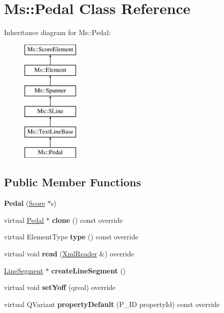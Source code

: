 \hypertarget{class_ms_1_1_pedal}{}\section{Ms\+:\+:Pedal Class Reference}
\label{class_ms_1_1_pedal}
Inheritance diagram for Ms\+:\+:Pedal\+:\begin{figure}[H]
\begin{center}
\leavevmode
\includegraphics[height=6.000000cm]{class_ms_1_1_pedal}
\end{center}
\end{figure}
\subsection*{Public Member Functions}
\begin{DoxyCompactItemize}
\item 
\mbox{\label{class_ms_1_1_pedal_a5778ce0dd5f31c2d91db97d389171541}} 
{\bfseries Pedal} (\hyperlink{class_ms_1_1_score}{Score} $\ast$s)
\item 
\mbox{\label{class_ms_1_1_pedal_a3888a6b2bb065247da7d2653dc054ebb}} 
virtual \hyperlink{class_ms_1_1_pedal}{Pedal} $\ast$ {\bfseries clone} () const override
\item 
\mbox{\label{class_ms_1_1_pedal_a3e37b6fb17d73077301087aed26f6cdc}} 
virtual Element\+Type {\bfseries type} () const override
\item 
\mbox{\label{class_ms_1_1_pedal_ab6a2aa95a32933995a1d143ed1a816d1}} 
virtual void {\bfseries read} (\hyperlink{class_ms_1_1_xml_reader}{Xml\+Reader} \&) override
\item 
\mbox{\label{class_ms_1_1_pedal_a8292749356ebaf816c7ecc975f12fc32}} 
\hyperlink{class_ms_1_1_line_segment}{Line\+Segment} $\ast$ {\bfseries create\+Line\+Segment} ()
\item 
\mbox{\label{class_ms_1_1_pedal_a5f2161f9ed451281de53504031f00106}} 
virtual void {\bfseries set\+Yoff} (qreal) override
\item 
\mbox{\label{class_ms_1_1_pedal_a874b3b7485e6596096290fee004d00be}} 
virtual Q\+Variant {\bfseries property\+Default} (P\+\_\+\+ID property\+Id) const override
\end{DoxyCompactItemize}

